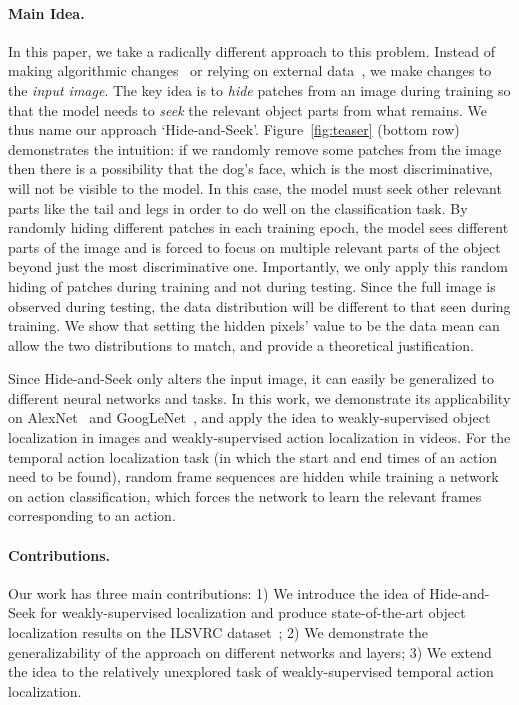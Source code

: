 \documentclass[10pt,twocolumn,letterpaper]{article}
\begin{document}
\vspace{-10pt}\paragraph{Main Idea.} In this paper, we take a radically different approach to this problem.  Instead of making algorithmic changes~\cite{song-nips2014,zhou-cvpr2016} or relying on external data~\cite{krishna-cvpr2016}, we make changes to the \emph{input image}.  The key idea is to \emph{hide} patches from an image during training so that the model needs to \emph{seek} the relevant object parts from what remains.  We thus name our approach `Hide-and-Seek'.  Figure~\ref{fig:teaser} (bottom row) demonstrates the intuition: if we randomly remove some patches from the image then there is a possibility that the dog's face, which is the most discriminative, will not be visible to the model. In this case, the model must seek other relevant parts like the tail and legs in order to do well on the classification task.  By randomly hiding different patches in each training epoch, the model sees different parts of the image and is forced to focus on multiple relevant parts of the object beyond just the most discriminative one.   Importantly, we only apply this random hiding of patches during training and not during testing.  Since the full image is observed during testing, the data distribution will be different to that seen during training.  We show that setting the hidden pixels' value to be the data mean can allow the two distributions to match, and provide a theoretical justification.

Since Hide-and-Seek only alters the input image, it can easily be generalized to different neural networks and tasks.  In this work, we demonstrate its applicability on AlexNet~\cite{krizhevsky-nips2012} and GoogLeNet~\cite{Szegedy-CVPR2015}, and apply the idea to weakly-supervised object localization in images and weakly-supervised action localization in videos.  For the temporal action localization task (in which the start and end times of an action need to be found), random frame sequences are hidden while training a network on action classification, which forces the network to learn the relevant frames corresponding to an action.

\vspace{-10pt}\paragraph{Contributions.} Our work has three main contributions: 1) We introduce the idea of Hide-and-Seek for weakly-supervised localization and produce state-of-the-art object localization results on the ILSVRC dataset~\cite{Russakovsky-IJCV2015}; 2) We demonstrate the generalizability of the approach on different networks and layers; 3) We extend the idea to the relatively unexplored task of weakly-supervised temporal action localization. 
\end{document}
